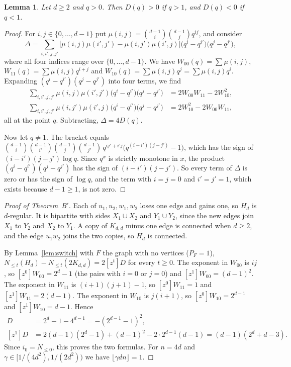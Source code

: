 \documentclass[11pt]{article}
\newtheorem{lemma}[theorem]{Lemma}
\theoremstyle{remark}
\newcommand{\Nle}[1]{N_{\le #1}}
\begin{document}
\begin{lemma}\label{lem:sign}
Let $d\ge2$ and $q>0$. Then $D(q)>0$ if $q>1$, and $D(q)<0$ if $q<1$.
\end{lemma}
\begin{proof}
For $i,j\in\{0,\dots,d-1\}$ put
$\mu(i,j)=\binom{d-1}i\binom{d-1}jq^{ij}$, and consider
\[
 \Delta=\sum_{i,i',j,j'}\bigl[\mu(i,j)\mu(i',j')-\mu(i,j')\mu(i',j)\bigr]
 \bigl(q^i-q^{i'}\bigr)\bigl(q^j-q^{j'}\bigr),
\]
where all four indices range over $\{0,\dots,d-1\}$. We have
$W_{00}(q)=\sum\mu(i,j)$, $W_{11}(q)=\sum\mu(i,j)q^{i+j}$ and
$W_{10}(q)=\sum\mu(i,j)q^j=\sum\mu(i,j)q^i$. Expanding
$(q^i-q^{i'})(q^j-q^{j'})$ into four terms, we find
\begin{align*}
 \sum_{i,i',j,j'}\mu(i,j)\mu(i',j')\bigl(q^i-q^{i'}\bigr)\bigl(q^j-q^{j'}\bigr)
 &=2W_{00}W_{11}-2W_{10}^2,\\
 \sum_{i,i',j,j'}\mu(i,j')\mu(i',j)\bigl(q^i-q^{i'}\bigr)\bigl(q^j-q^{j'}\bigr)
 &=2W_{10}^2-2W_{00}W_{11},
\end{align*}
all at the point $q$. Subtracting, $\Delta=4D(q)$.

Now let $q\ne1$. The bracket equals
$\binom{d-1}i\binom{d-1}{i'}\binom{d-1}j\binom{d-1}{j'}\,
q^{ij'+i'j}\bigl(q^{(i-i')(j-j')}-1\bigr)$, which has the sign of
$(i-i')(j-j')\log q$. Since $q^x$ is strictly monotone in $x$, the product
$(q^i-q^{i'})(q^j-q^{j'})$ has the sign of $(i-i')(j-j')$. So every term of
$\Delta$ is zero or has the sign of $\log q$, and the term with $i=j=0$ and
$i'=j'=1$, which exists because $d-1\ge1$, is not zero.
\end{proof}

\begin{proof}[Proof of Theorem~B$'$]
Each of $u_1,u_2,w_1,w_2$ loses one edge and gains one, so $H_d$ is
$d$-regular. It is bipartite with sides $X_1\cup X_2$ and $Y_1\cup Y_2$,
since the new edges join $X_1$ to $Y_2$ and $X_2$ to $Y_1$. A copy of
$K_{d,d}$ minus one edge is connected when $d\ge2$, and the edge $u_1w_2$ joins
the two copies, so $H_d$ is connected.

By Lemma~\ref{lem:switch} with $F$ the graph with no vertices ($P_F=1$),
$\Nle t(H_d)-\Nle t(2K_{d,d})=2[z^t]D$ for every $t\ge0$. The exponent in
$W_{00}$ is $ij$, so $[z^0]W_{00}=2^d-1$ (the pairs with $i=0$ or $j=0$) and
$[z^1]W_{00}=(d-1)^2$. The exponent in $W_{11}$ is $(i+1)(j+1)-1$, so
$[z^0]W_{11}=1$ and $[z^1]W_{11}=2(d-1)$. The exponent in $W_{10}$ is
$j(i+1)$, so $[z^0]W_{10}=2^{d-1}$ and $[z^1]W_{10}=d-1$. Hence
\begin{align*}
 [z^0]D&=2^d-1-4^{d-1}=-(2^{d-1}-1)^2,\\
 [z^1]D&=2(d-1)(2^d-1)+(d-1)^2-2\cdot2^{d-1}(d-1)=(d-1)(2^d+d-3).
\end{align*}
Since $i_0=N_{\le0}$, this proves the two formulas. For $n=4d$ and
$\gamma\in[1/(4d^2),1/(2d^2))$ we have $\lfloor\gamma dn\rfloor=1$.
\end{proof}
\end{document}
